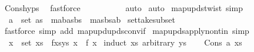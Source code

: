 \begin{isabellebody}
\ Cons{\isachardot}{\kern0pt}hyps\ \isamarkupfalse%
\ fastforce{\isacharplus}{\kern0pt}\isanewline
\ \ \ \ \ \ \isamarkupfalse%
\isanewline
\ \ \isamarkupfalse%
\ auto\isanewline
{}\isamarkupfalse%
\ auto%
\endisatagproof
{\isafoldproof}%
%
\isadelimproof
\isanewline
%
\endisadelimproof
\isanewline
\isanewline
{}\isamarkupfalse%
\ map{\isacharunderscore}{\kern0pt}upds{\isacharunderscore}{\kern0pt}twist\ {\isacharbrackleft}{\kern0pt}simp{\isacharbrackright}{\kern0pt}{\isacharcolon}{\kern0pt}\isanewline
\ \ {\isachardoublequoteopen}a\ {\isasymnotin}\ set\ as\ {\isasymLongrightarrow}\ m{\isacharparenleft}{\kern0pt}a{\isasymmapsto}b{\isacharparenright}{\kern0pt}{\isacharparenleft}{\kern0pt}as{\isacharbrackleft}{\kern0pt}{\isasymmapsto}{\isacharbrackright}{\kern0pt}bs{\isacharparenright}{\kern0pt}\ {\isacharequal}{\kern0pt}\ m{\isacharparenleft}{\kern0pt}as{\isacharbrackleft}{\kern0pt}{\isasymmapsto}{\isacharbrackright}{\kern0pt}bs{\isacharparenright}{\kern0pt}{\isacharparenleft}{\kern0pt}a{\isasymmapsto}b{\isacharparenright}{\kern0pt}{\isachardoublequoteclose}\isanewline
%
\isadelimproof
%
\endisadelimproof
%
\isatagproof
{}\isamarkupfalse%
\ set{\isacharunderscore}{\kern0pt}take{\isacharunderscore}{\kern0pt}subset\ \isamarkupfalse%
\ {\isacharparenleft}{\kern0pt}fastforce\ simp\ add{\isacharcolon}{\kern0pt}\ map{\isacharunderscore}{\kern0pt}upd{\isacharunderscore}{\kern0pt}upds{\isacharunderscore}{\kern0pt}conv{\isacharunderscore}{\kern0pt}if{\isacharparenright}{\kern0pt}%
\endisatagproof
{\isafoldproof}%
%
\isadelimproof
\isanewline
%
\endisadelimproof
\isanewline
{}\isamarkupfalse%
\ map{\isacharunderscore}{\kern0pt}upds{\isacharunderscore}{\kern0pt}apply{\isacharunderscore}{\kern0pt}nontin\ {\isacharbrackleft}{\kern0pt}simp{\isacharbrackright}{\kern0pt}{\isacharcolon}{\kern0pt}\isanewline
\ \ {\isachardoublequoteopen}x\ {\isasymnotin}\ set\ xs\ {\isasymLongrightarrow}\ {\isacharparenleft}{\kern0pt}f{\isacharparenleft}{\kern0pt}xs{\isacharbrackleft}{\kern0pt}{\isasymmapsto}{\isacharbrackright}{\kern0pt}ys{\isacharparenright}{\kern0pt}{\isacharparenright}{\kern0pt}\ x\ {\isacharequal}{\kern0pt}\ f\ x{\isachardoublequoteclose}\isanewline
%
\isadelimproof
%
\endisadelimproof
%
\isatagproof
{}\isamarkupfalse%
\ {\isacharparenleft}{\kern0pt}induct\ xs\ arbitrary{\isacharcolon}{\kern0pt}\ ys{\isacharparenright}{\kern0pt}\isanewline
\ \ \isamarkupfalse%
\ {\isacharparenleft}{\kern0pt}Cons\ a\ xs{\isacharparenright}{\kern0pt}\isanewline

\end{isabellebody}
